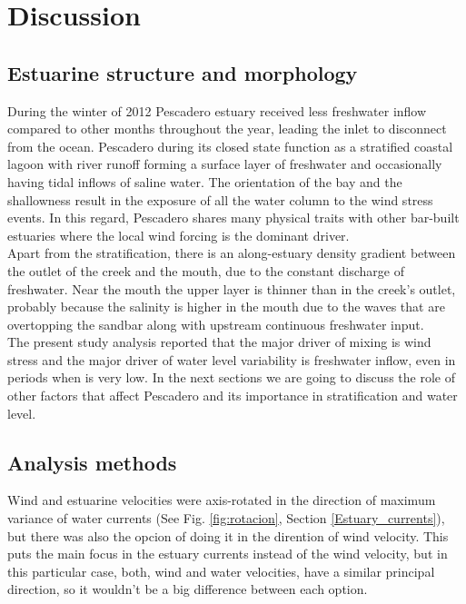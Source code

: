\documentclass[tesis.tex]{subfiles}
\begin{document}
    
\section{Discussion}

\subsection{Estuarine structure and morphology}

During the winter of 2012 Pescadero estuary received less freshwater inflow compared to other months throughout the year, leading the inlet to disconnect from the ocean. Pescadero during its closed state function as a stratified coastal lagoon with river runoff forming a surface layer of freshwater and occasionally having tidal inflows of saline water. The orientation of the bay and the shallowness result in the exposure of all the water column to the wind stress events. In this regard, Pescadero shares many physical traits with other bar-built estuaries where the local wind forcing is the dominant driver.\\

Apart from the stratification, there is an along-estuary density gradient between the outlet of the creek and the mouth, due to the constant discharge of freshwater. Near the mouth the upper layer is thinner than in the creek's outlet, probably because the salinity is higher in the mouth due to the waves that are overtopping the sandbar along with upstream continuous freshwater input.\\

The present study analysis reported that the major driver of mixing is wind stress and the major driver of water level variability is freshwater inflow, even in periods when is very low. In the next sections we are going to discuss the role of other factors that affect Pescadero and its importance in stratification and water level.\\

\subsection{Analysis methods}

Wind and estuarine velocities were axis-rotated in the direction of maximum variance of water currents (See Fig. \ref{fig:rotacion}, Section \ref{Estuary_currents}), but there was also the opcion of doing it in the dirention of wind velocity. This puts the main focus in the estuary currents instead of the wind velocity, but in this particular case, both, wind and water velocities, have a similar principal direction, so it wouldn't be a big difference between each option.\\
\end{document}
